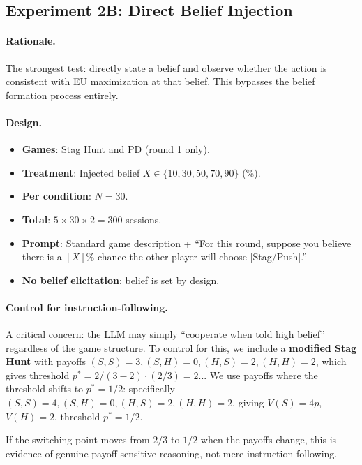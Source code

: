 \documentclass[12pt]{article}
\begin{document}
\subsection{Experiment 2B: Direct Belief Injection}
\label{sec:exp2b}

\paragraph{Rationale.}
The strongest test: directly state a belief and observe whether the action is consistent with EU maximization at that belief. This bypasses the belief formation process entirely.

\paragraph{Design.}
\begin{itemize}[nosep]
    \item \textbf{Games}: Stag Hunt and PD (round 1 only).
    \item \textbf{Treatment}: Injected belief $X \in \{10, 30, 50, 70, 90\}$ (\%).
    \item \textbf{Per condition}: $N = 30$.
    \item \textbf{Total}: $5 \times 30 \times 2 = 300$ sessions.
    \item \textbf{Prompt}: Standard game description + ``For this round, suppose you believe there is a $[X]\%$ chance the other player will choose [Stag/Push].''
    \item \textbf{No belief elicitation}: belief is set by design.
\end{itemize}

\paragraph{Control for instruction-following.}
A critical concern: the LLM may simply ``cooperate when told high belief'' regardless of the game structure. To control for this, we include a \textbf{modified Stag Hunt} with payoffs $(S,S)=3, (S,H)=0, (H,S)=2, (H,H)=2$, which gives threshold $p^* = 2/(3-2) \cdot (2/3) = 2$... We use payoffs where the threshold shifts to $p^* = 1/2$: specifically $(S,S)=4, (S,H)=0, (H,S)=2, (H,H)=2$, giving $V(S) = 4p$, $V(H) = 2$, threshold $p^* = 1/2$.

If the switching point moves from $2/3$ to $1/2$ when the payoffs change, this is evidence of genuine payoff-sensitive reasoning, not mere instruction-following.
\end{document}

